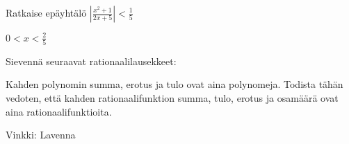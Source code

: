 \begin{tehtavasivu}

\begin{tehtava}
	Ratkaise epäyhtälö $|\frac{x^2+1}{2x+5}| < \frac15$
	\begin{vastaus}
		$0 < x < \frac25$
	\end{vastaus}
\end{tehtava}

\begin{tehtava}
Sievennä seuraavat rationaalilausekkeet:

\begin{vastaus}
\end{vastaus}
\end{tehtava}

\begin{tehtava}
Kahden polynomin summa, erotus ja tulo ovat aina polynomeja. Todista tähän vedoten, että kahden rationaalifunktion summa, tulo, erotus ja osamäärä ovat aina rationaalifunktioita.
\begin{vastaus}
Vinkki: Lavenna
\end{vastaus}
\end{tehtava}

\end{tehtavasivu}
